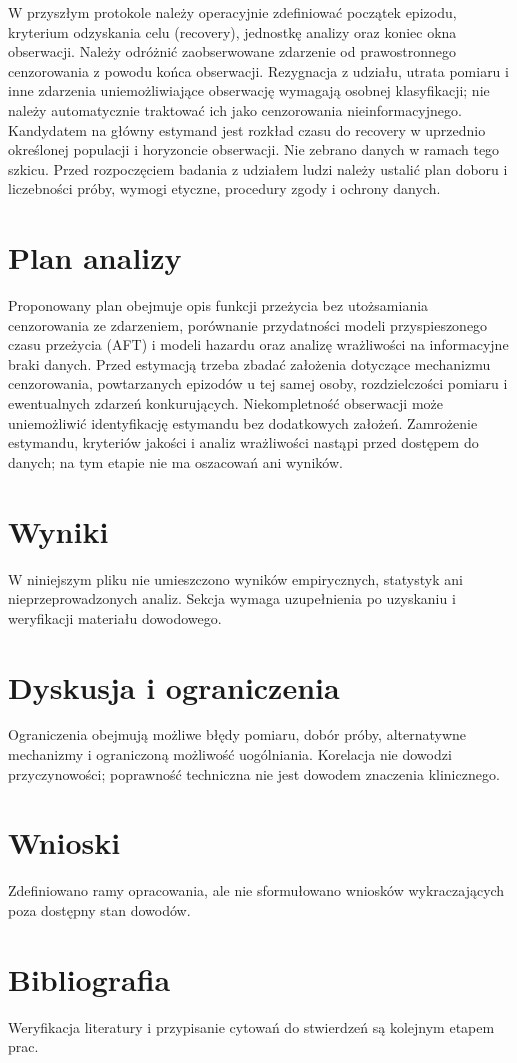 \documentclass[11pt,a4paper]{article}
\begin{document}
W przyszłym protokole należy operacyjnie zdefiniować początek epizodu, kryterium odzyskania celu (recovery), jednostkę analizy oraz koniec okna obserwacji. Należy odróżnić zaobserwowane zdarzenie od prawostronnego cenzorowania z powodu końca obserwacji. Rezygnacja z udziału, utrata pomiaru i inne zdarzenia uniemożliwiające obserwację wymagają osobnej klasyfikacji; nie należy automatycznie traktować ich jako cenzorowania nieinformacyjnego. Kandydatem na główny estymand jest rozkład czasu do recovery w uprzednio określonej populacji i horyzoncie obserwacji. Nie zebrano danych w ramach tego szkicu. Przed rozpoczęciem badania z udziałem ludzi należy ustalić plan doboru i liczebności próby, wymogi etyczne, procedury zgody i ochrony danych.

\section{Plan analizy}

Proponowany plan obejmuje opis funkcji przeżycia bez utożsamiania cenzorowania ze zdarzeniem, porównanie przydatności modeli przyspieszonego czasu przeżycia (AFT) i modeli hazardu oraz analizę wrażliwości na informacyjne braki danych. Przed estymacją trzeba zbadać założenia dotyczące mechanizmu cenzorowania, powtarzanych epizodów u tej samej osoby, rozdzielczości pomiaru i ewentualnych zdarzeń konkurujących. Niekompletność obserwacji może uniemożliwić identyfikację estymandu bez dodatkowych założeń. Zamrożenie estymandu, kryteriów jakości i analiz wrażliwości nastąpi przed dostępem do danych; na tym etapie nie ma oszacowań ani wyników.

\section{Wyniki}

W niniejszym pliku nie umieszczono wyników empirycznych, statystyk ani nieprzeprowadzonych analiz. Sekcja wymaga uzupełnienia po uzyskaniu i weryfikacji materiału dowodowego.

\section{Dyskusja i ograniczenia}

Ograniczenia obejmują możliwe błędy pomiaru, dobór próby, alternatywne mechanizmy i ograniczoną możliwość uogólniania. Korelacja nie dowodzi przyczynowości; poprawność techniczna nie jest dowodem znaczenia klinicznego.

\section{Wnioski}

Zdefiniowano ramy opracowania, ale nie sformułowano wniosków wykraczających poza dostępny stan dowodów.

\section*{Bibliografia}

Weryfikacja literatury i przypisanie cytowań do stwierdzeń są kolejnym etapem prac.
\end{document}
